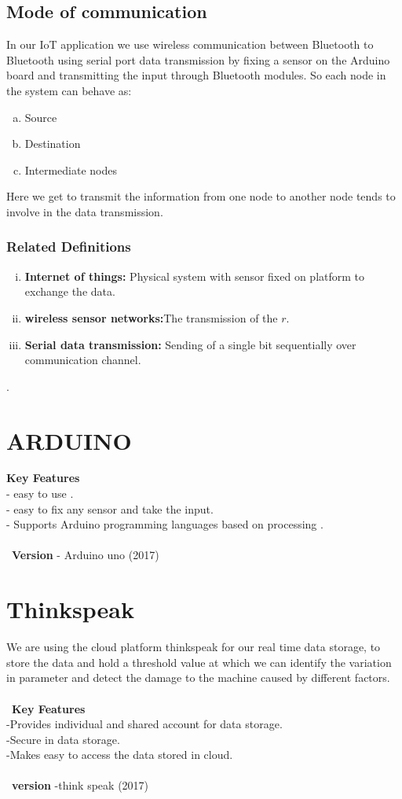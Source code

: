      
\subsection{ Mode of communication}
In our IoT application we use wireless communication between Bluetooth to Bluetooth using serial port data transmission by fixing a sensor on the Arduino board and transmitting the input through Bluetooth modules. 
So each node in the system can behave as:
\begin{enumerate}[(a)]
 \item Source
 \item Destination
 \item Intermediate nodes
\end{enumerate}
Here we get to transmit the information from one node to another node tends to involve in the data transmission.  

\subsubsection{Related Definitions}
\begin{enumerate}[(i)]
 \item {\bf Internet of things:} Physical system with sensor fixed on platform to exchange the data.
 \item {\bf wireless sensor networks:}The transmission of the  $r$.
 \item {\bf Serial data transmission:} Sending of a single bit sequentially over communication channel.
 
\end{enumerate}
\citet{edtr7}.

\section{ARDUINO } 
{\bf Key Features} \\
- easy to use . \\
- easy to fix any sensor and take the input. \\
- Supports Arduino programming languages based on processing . \\
 \\\
{\bf Version} - Arduino uno (2017)
\section {Thinkspeak}
We are using the cloud platform thinkspeak for our real time data storage, to store the data and hold a threshold value at which we can identify the variation in parameter and detect the damage to the machine caused by different factors.\\\
\\\
{\bf Key Features} \\
-Provides individual and shared account for data storage. \\
-Secure in data storage. \\
-Makes easy to access the data stored in cloud.\\
\\\
{\bf version}  -think speak (2017)
